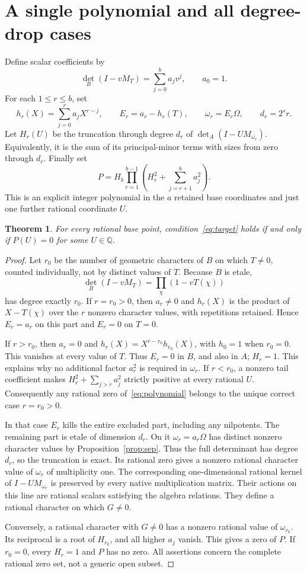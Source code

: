 \documentclass[11pt,a4paper]{article}
\newtheorem{theorem}{Theorem}[section]
\newcommand{\Q}{\mathbb Q}\newcommand{\Z}{\mathbb Z}
\begin{document}
\section{A single polynomial and all degree-drop cases}\label{sec:formula}
Define scalar coefficients by
\[
 \det_B(I-vM_T)=\sum_{j=0}^b a_jv^j,\qquad a_0=1.
\]
For each $1\le r\le b$, set
\[
 h_r(X)=\sum_{j=0}^r a_jX^{r-j},\qquad E_r=a_r-h_r(T),\qquad
 \omega_r=E_r\Omega,\qquad d_r=2^s r.
\]
Let $H_r(U)$ be the truncation through degree $d_r$ of
$\det_A(I-UM_{\omega_r})$. Equivalently, it is the sum of its principal-minor
terms with sizes from zero through $d_r$. Finally set
\begin{equation}\label{eq:polynomial}
 P=H_b\prod_{r=1}^{b-1}\left(H_r^2+\sum_{j=r+1}^b a_j^2\right).
\end{equation}
This is an explicit integer polynomial in the $a$ retained base coordinates
and just one further rational coordinate $U$.

\begin{theorem}\label{thm:projection}
For every rational base point, condition~\eqref{eq:target} holds if and
only if $P(U)=0$ for some $U\in\Q$.
\end{theorem}
\begin{proof}
Let $r_0$ be the number of geometric characters of $B$ on which $T\ne0$,
counted individually, not by distinct values of $T$. Because $B$ is etale,
\[
 \det_B(I-vM_T)=\prod_\chi(1-vT(\chi))
\]
has degree exactly $r_0$. If $r=r_0>0$, then $a_r\ne0$ and
$h_r(X)$ is the product of $X-T(\chi)$ over the $r$ nonzero character
values, with repetitions retained. Hence $E_r=a_r$ on this part and
$E_r=0$ on $T=0$.

If $r>r_0$, then $a_r=0$ and
$h_r(X)=X^{r-r_0}h_{r_0}(X)$, with $h_0=1$ when $r_0=0$.
This vanishes at every value of $T$. Thus $E_r=0$ in $B$, and also in $A$;
$H_r=1$. This explains why no additional factor $a_r^2$ is required in
$\omega_r$. If $r<r_0$, a nonzero tail coefficient makes
$H_r^2+\sum_{j>r}a_j^2$ strictly positive at every rational $U$.
Consequently any rational zero of~\eqref{eq:polynomial} belongs to the
unique correct case $r=r_0>0$.

In that case $E_r$ kills the entire excluded part, including any nilpotents.
The remaining part is etale of dimension $d_r$. On it $\omega_r=a_r\Omega$
has distinct nonzero character values by Proposition~\ref{prop:sep}.
Thus the full determinant has degree $d_r$, so the truncation is exact.
Its rational zero gives a nonzero rational character value of $\omega_r$
of multiplicity one. The corresponding one-dimensional rational kernel
of $I-UM_{\omega_r}$ is preserved by every native multiplication matrix.
Their actions on this line are rational scalars satisfying the algebra
relations. They define a rational character on which $G\ne0$.

Conversely, a rational character with $G\ne0$ has a nonzero rational
value of $\omega_{r_0}$. Its reciprocal is a root of $H_{r_0}$, and all
higher $a_j$ vanish. This gives a zero of $P$. If $r_0=0$, every $H_r=1$
and $P$ has no zero. All assertions concern the complete rational zero
set, not a generic open subset.
\end{proof}
\end{document}
